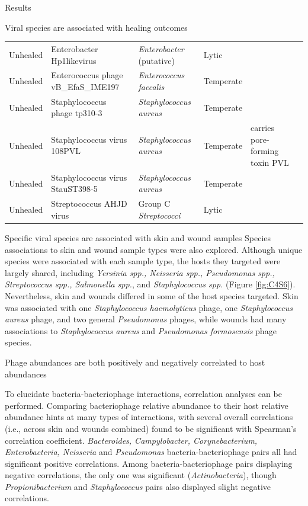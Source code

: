 \documentclass[oneside,12pt,final]{sty/ucthesis-CA2012}
\begin{document}
\begin{mainmatter}
\begin{section}{Results}
\begin{subsection}{Viral species are associated with healing outcomes}
\begin{table}[]
\begin{tabular}{p{}p{}p{}p{}p{}p{}}
\hline
\hline
Unhealed & Enterobacter Hp1likevirus & \textit{Enterobacter} (putative) & Lytic & & \cite{RN189} \\
Unhealed & Enterococcus phage vB\_EfaS\_IME197 & \textit{Enterococcus faecalis} & Temperate & & \cite{RN190} \\
Unhealed & Staphylococcus phage tp310-3 & \textit{Staphylococcus aureus} & Temperate & & \cite{RN191} \\
Unhealed & Staphylococcus virus 108PVL & \textit{Staphylococcus aureus} & Temperate & carries pore-forming toxin PVL & \cite{RN192} \\
Unhealed & Staphylococcus virus StauST398-5 & \textit{Staphylococcus aureus} & Temperate & & \cite{RN193} \\
Unhealed & Streptococcus AHJD virus & Group C \textit{Streptococci} & Lytic & & \cite{RN194} \\
\hline
\end{tabular}
\end{table}
\end{subsection}

\begin{subsection}{Specific viral species are associated with skin and wound samples}
Species associations to skin and wound sample types were also explored. Although unique species were associated with each sample type, the hosts they targeted were largely shared, including \textit{Yersinia spp., Neisseria spp., Pseudomonas spp., Streptococcus spp., Salmonella spp.}, and \textit{Staphylococcus spp.} (Figure \ref{fig:C4S6}). Nevertheless, skin and wounds differed in some of the host species targeted. Skin was associated with one \textit{Staphylococcus haemolyticus} phage, one \textit{Staphylococcus aureus} phage, and two general \textit{Pseudomonas} phages, while wounds had many associations to \textit{Staphylococcus aureus} and \textit{Pseudomonas formosensis} phage species.
\end{subsection}

\begin{subsection}{Phage abundances are both positively and negatively correlated to host abundances}

To elucidate bacteria-bacteriophage interactions, correlation analyses can be performed. Comparing bacteriophage relative abundance to their host relative abundance hints at many types of interactions, with several overall correlations (i.e., across skin and wounds combined) found to be significant with Spearman's correlation coefficient. \textit{Bacteroides, Campylobacter,  Corynebacterium, Enterobacteria, Neisseria} and \textit{Pseudomonas} bacteria-bacteriophage pairs all had significant positive correlations. Among bacteria-bacteriophage pairs displaying negative correlations, the only one was significant (\textit{Actinobacteria}), though \textit{Propionibacterium} and \textit{Staphylococcus} pairs also displayed slight negative correlations.


\end{subsection}
\end{section}
\end{mainmatter}
\end{document}
